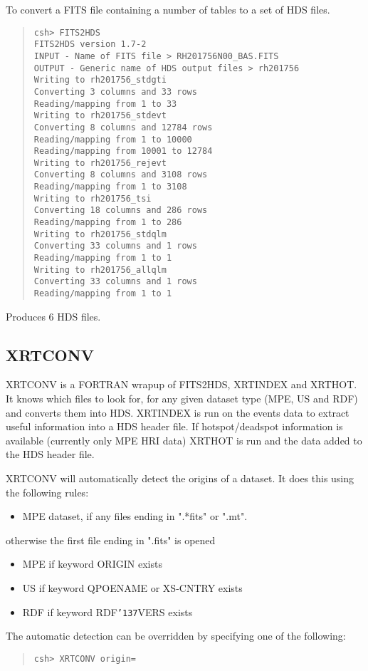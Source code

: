 \documentclass{book}
\renewcommand{\_}{{\tt\char'137}}     %
\begin{document}
To convert a FITS file containing a number of tables to a set of HDS
files.
\begin{quote}\begin{verbatim}
csh> FITS2HDS
FITS2HDS version 1.7-2
INPUT - Name of FITS file > RH201756N00_BAS.FITS
OUTPUT - Generic name of HDS output files > rh201756
Writing to rh201756_stdgti
Converting 3 columns and 33 rows
Reading/mapping from 1 to 33
Writing to rh201756_stdevt
Converting 8 columns and 12784 rows
Reading/mapping from 1 to 10000
Reading/mapping from 10001 to 12784
Writing to rh201756_rejevt
Converting 8 columns and 3108 rows
Reading/mapping from 1 to 3108
Writing to rh201756_tsi
Converting 18 columns and 286 rows
Reading/mapping from 1 to 286
Writing to rh201756_stdqlm
Converting 33 columns and 1 rows
Reading/mapping from 1 to 1
Writing to rh201756_allqlm
Converting 33 columns and 1 rows
Reading/mapping from 1 to 1
\end{verbatim}\end{quote}
Produces 6 HDS files.
 
\subsection{XRTCONV}
XRTCONV is a FORTRAN wrapup of FITS2HDS, XRTINDEX and XRTHOT. It
knows which files to look for, for any given dataset type (MPE, US and RDF)
and converts them into HDS. XRTINDEX is run on the events data to
extract useful information into a HDS header file. If hotspot/deadspot
information is available (currently only MPE HRI data) XRTHOT is run
and the data added to the HDS header file.
 
XRTCONV will automatically detect the origins of a dataset. It does this
using the following rules:
\begin{itemize}
\item MPE dataset, if any files ending in ".*fits" or ".mt".
\end{itemize}
otherwise the first file ending in ".fits" is opened
\begin{itemize}
\item MPE if keyword ORIGIN exists
\item US if keyword QPOENAME or XS-CNTRY exists
\item RDF if keyword RDF\_VERS exists
\end{itemize}
The automatic detection can be overridden by specifying one of the
following:
 
\begin{quote}\begin{verbatim}
csh> XRTCONV origin= 
\end{verbatim}\end{quote}
\end{document}
